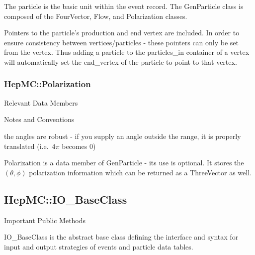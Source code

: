 \documentclass[11pt,letterpaper]{article}
\begin{document}
The particle is the basic unit within the event record. The GenParticle
class is composed of the FourVector, Flow, and Polarization classes. 

Pointers to the particle's production and end vertex are included. In
order to ensure consistency between vertices/particles - these
pointers can only be set from the vertex. Thus adding a particle to
the particles\_in container of a vertex will automatically set the
end\_vertex of the particle to point to that vertex. 

%
%

\subsubsection{HepMC::Polarization}
\begin{myitemize}{Relevant Data Members}
\end{myitemize}
\begin{myitemize}{Notes and Conventions}
  \item the angles are robust - if you supply an angle outside the
    range, it is properly translated (i.e.\ $4\pi$ becomes 0)
\end{myitemize}

Polarization is a data member of GenParticle - its use is
optional. It stores the $(\theta,\phi)$ polarization information which
can be returned as a ThreeVector as well.

%
%

\subsection{HepMC::IO\_BaseClass}
\begin{myitemize}{Important Public Methods}
\end{myitemize}

IO\_BaseClass is the abstract base class defining the interface and
syntax for input and output strategies of events and particle data tables.
\end{document}
